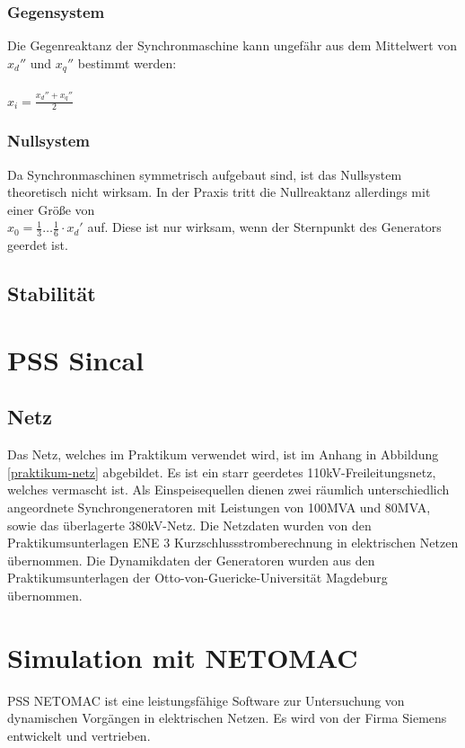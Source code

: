 \documentclass{scrartcl}
\begin{document}
\begin{onehalfspace}
\subsubsection{Gegensystem}
Die Gegenreaktanz der Synchronmaschine kann ungefähr aus dem Mittelwert von $x_d''$ und $x_q''$ bestimmt werden: \\ \\
$x_i = \frac{x_d'' + x_q''}{2}$

\subsubsection{Nullsystem}
Da Synchronmaschinen symmetrisch aufgebaut sind, ist das Nullsystem theoretisch nicht wirksam. In der Praxis tritt die Nullreaktanz allerdings mit einer Größe von \\
$x_0 = \frac{1}{3} … \frac{1}{6} \cdot x_d'$ auf. Diese ist nur wirksam, wenn der Sternpunkt des Generators geerdet ist.



\subsection{Stabilität}

\section{PSS Sincal}

\subsection{Netz}
Das Netz, welches im Praktikum verwendet wird, ist im Anhang in Abbildung \ref{praktikum-netz} abgebildet. Es ist ein starr geerdetes 110kV-Freileitungsnetz, welches vermascht ist. Als Einspeisequellen dienen zwei räumlich unterschiedlich angeordnete Synchrongeneratoren mit Leistungen von 100MVA und 80MVA, sowie das überlagerte 380kV-Netz. Die Netzdaten wurden von den Praktikumsunterlagen \glqq ENE 3 Kurzschlussstromberechnung in elektrischen Netzen\grqq{} übernommen. Die Dynamikdaten der Generatoren wurden aus den Praktikumsunterlagen der Otto-von-Guericke-Universität Magdeburg übernommen.

\section{Simulation mit NETOMAC}
PSS NETOMAC ist eine leistungsfähige Software zur Untersuchung von dynamischen Vorgängen in elektrischen Netzen. Es wird von der Firma Siemens entwickelt und vertrieben.


\end{onehalfspace}
\end{document}
